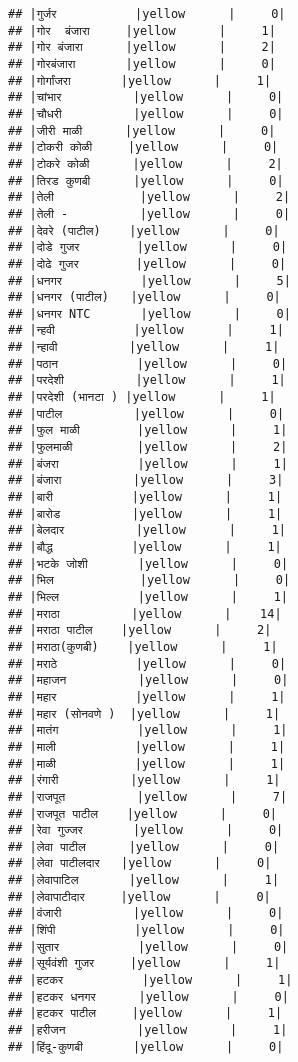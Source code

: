 \documentclass[
]{article}
\begin{document}
\begin{verbatim}
## |गुर्जर           |yellow      |     0|
## |गोर  बंजारा     |yellow      |     1|
## |गोर बंजारा      |yellow      |     2|
## |गोरबंजारा       |yellow      |     0|
## |गोर्गांजरा       |yellow      |     1|
## |चांभार          |yellow      |     0|
## |चौधरी          |yellow      |     0|
## |जीरी माळी      |yellow      |     0|
## |टोकरी कोळी     |yellow      |     0|
## |टोकरे कोळी      |yellow      |     2|
## |तिरड कुणबी      |yellow      |     0|
## |तेली            |yellow      |     2|
## |तेली -          |yellow      |     0|
## |देवरे (पाटील)    |yellow      |     0|
## |दोडे गुजर        |yellow      |     0|
## |दोढे गुजर        |yellow      |     0|
## |धनगर           |yellow      |     5|
## |धनगर (पाटील)   |yellow      |     0|
## |धनगर NTC       |yellow      |     0|
## |न्हवी           |yellow      |     1|
## |न्हावी          |yellow      |     1|
## |पठान           |yellow      |     0|
## |परदेशी          |yellow      |     1|
## |परदेशी (भानटा ) |yellow      |     1|
## |पाटील          |yellow      |     0|
## |फुल माळी        |yellow      |     1|
## |फुलमाळी         |yellow      |     2|
## |बंजरा           |yellow      |     1|
## |बंजारा          |yellow      |     3|
## |बारी           |yellow      |     1|
## |बारोड          |yellow      |     1|
## |बेलदार          |yellow      |     1|
## |बौद्ध           |yellow      |     1|
## |भटके जोशी       |yellow      |     0|
## |भिल            |yellow      |     0|
## |भिल्ल           |yellow      |     1|
## |मराठा          |yellow      |    14|
## |मराठा पाटील    |yellow      |     2|
## |मराठा(कुणबी)    |yellow      |     1|
## |मराठे           |yellow      |     0|
## |महाजन          |yellow      |     0|
## |महार           |yellow      |     1|
## |महार (सोनवणे )  |yellow      |     1|
## |मातंग           |yellow      |     1|
## |माली           |yellow      |     1|
## |माळी           |yellow      |     1|
## |रंगारी          |yellow      |     1|
## |राजपूत          |yellow      |     7|
## |राजपूत पाटील    |yellow      |     0|
## |रेवा गुज्जर       |yellow      |     0|
## |लेवा पाटील      |yellow      |     0|
## |लेवा पाटीलदार   |yellow      |     0|
## |लेवापाटिल       |yellow      |     1|
## |लेवापाटीदार     |yellow      |     0|
## |वंजारी          |yellow      |     0|
## |शिंपी           |yellow      |     0|
## |सुतार           |yellow      |     0|
## |सूर्यवंशी गुजर     |yellow      |     1|
## |हटकर           |yellow      |     1|
## |हटकर धनगर      |yellow      |     0|
## |हटकर पाटील     |yellow      |     1|
## |हरीजन          |yellow      |     1|
## |हिंदू-कुणबी       |yellow      |     0|

\end{verbatim}
\end{document}

